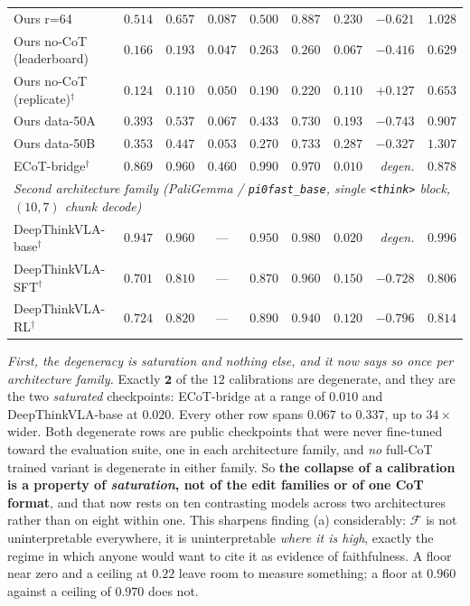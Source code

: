 \documentclass{article}
\begin{document}
\begin{table}[t]
\begin{tabular}{lcccccrrr}
Ours r=64             & $0.514$ & $0.657$ & $0.087$ & $0.500$ & $0.887$ & $0.230$ & $-0.621$ & $1.028$ \\
Ours no-CoT (leaderboard)          & $0.166$ & $0.193$ & $0.047$ & $0.263$ & $0.260$ & $0.067$ & $-0.416$ & $0.629$ \\
Ours no-CoT (replicate)$^\dagger$  & $0.124$ & $0.110$ & $0.050$ & $0.190$ & $0.220$ & $0.110$ & $\mathbf{+0.127}$ & $0.653$ \\
Ours data-50A         & $0.393$ & $0.537$ & $0.067$ & $0.433$ & $0.730$ & $0.193$ & $-0.743$ & $0.907$ \\
Ours data-50B         & $0.353$ & $0.447$ & $0.053$ & $0.270$ & $0.733$ & $0.287$ & $-0.327$ & $1.307$ \\
ECoT-bridge$^\dagger$ & $0.869$ & $0.960$ & $0.460$ & $0.990$ & $0.970$ & $\mathbf{0.010}$ & \emph{degen.} & $0.878$ \\
\midrule
\multicolumn{9}{l}{\emph{Second architecture family (PaliGemma / \texttt{pi0fast\_base}, single \texttt{<think>} block, $(10,7)$ chunk decode)}} \\
DeepThinkVLA-base$^\dagger$ & $0.947$ & $0.960$ & --- & $0.950$ & $0.980$ & $\mathbf{0.020}$ & \emph{degen.} & $0.996$ \\
DeepThinkVLA-SFT$^\dagger$  & $0.701$ & $0.810$ & --- & $0.870$ & $0.960$ & $0.150$ & $-0.728$ & $0.806$ \\
DeepThinkVLA-RL$^\dagger$   & $0.724$ & $0.820$ & --- & $0.890$ & $0.940$ & $0.120$ & $-0.796$ & $0.814$ \\
\bottomrule
\end{tabular}
\end{table}

\emph{First, the degeneracy is saturation and nothing else, and it now says so once per architecture family.} Exactly $\mathbf{2}$ of the $12$ calibrations are degenerate, and they are the two \emph{saturated} checkpoints: ECoT-bridge at a range of $0.010$ and DeepThinkVLA-base at $0.020$. Every other row spans $0.067$ to $0.337$, up to $34\times$ wider. Both degenerate rows are public checkpoints that were never fine-tuned toward the evaluation suite, one in each architecture family, and \emph{no} full-CoT trained variant is degenerate in either family. So \textbf{the collapse of a calibration is a property of \emph{saturation}, not of the edit families or of one CoT format}, and that now rests on ten contrasting models across two architectures rather than on eight within one. This sharpens finding (a) considerably: $\mathcal{F}$ is not uninterpretable everywhere, it is uninterpretable \emph{where it is high}, exactly the regime in which anyone would want to cite it as evidence of faithfulness. A floor near zero and a ceiling at $0.22$ leave room to measure something; a floor at $0.960$ against a ceiling of $0.970$ does not.
\end{document}
